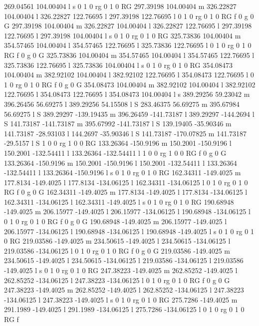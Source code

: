 269.04561 104.00404 l 
s 
0 1 0 rg 0 1 0 RG 
297.39198 104.00404 m 
326.22827 104.00404 l 
326.22827 122.76695 l 
297.39198 122.76695 l 
0 1 0 rg 0 1 0 RG f 
0 g 0 G 
297.39198 104.00404 m 
326.22827 104.00404 l 
326.22827 122.76695 l 
297.39198 122.76695 l 
297.39198 104.00404 l 
s 
0 1 0 rg 0 1 0 RG 
325.73836 104.00404 m 
354.57465 104.00404 l 
354.57465 122.76695 l 
325.73836 122.76695 l 
0 1 0 rg 0 1 0 RG f 
0 g 0 G 
325.73836 104.00404 m 
354.57465 104.00404 l 
354.57465 122.76695 l 
325.73836 122.76695 l 
325.73836 104.00404 l 
s 
0 1 0 rg 0 1 0 RG 
354.08473 104.00404 m 
382.92102 104.00404 l 
382.92102 122.76695 l 
354.08473 122.76695 l 
0 1 0 rg 0 1 0 RG f 
0 g 0 G 
354.08473 104.00404 m 
382.92102 104.00404 l 
382.92102 122.76695 l 
354.08473 122.76695 l 
354.08473 104.00404 l 
s 
389.29256 59.23042 m 
396.26456 56.69275 l 
389.29256 54.15508 l 
S 
283.46375 56.69275 m 
395.67984 56.69275 l 
S 
389.29297 -139.19435 m 
396.26459 -141.73187 l 
389.29297 -144.2694 l 
S 
141.73187 -141.73187 m 
395.67992 -141.73187 l 
S 
139.19405 -35.90346 m 
141.73187 -28.93103 l 
144.2697 -35.90346 l 
S 
141.73187 -170.07825 m 
141.73187 -29.5157 l 
S 
1 0 0 rg 1 0 0 RG 
133.26364 -150.9196 m 
150.2001 -150.9196 l 
150.2001 -132.54411 l 
133.26364 -132.54411 l 
1 0 0 rg 1 0 0 RG f 
0 g 0 G 
133.26364 -150.9196 m 
150.2001 -150.9196 l 
150.2001 -132.54411 l 
133.26364 -132.54411 l 
133.26364 -150.9196 l 
s 
0 1 0 rg 0 1 0 RG 
162.34311 -149.4025 m 
177.8134 -149.4025 l 
177.8134 -134.06125 l 
162.34311 -134.06125 l 
0 1 0 rg 0 1 0 RG f 
0 g 0 G 
162.34311 -149.4025 m 
177.8134 -149.4025 l 
177.8134 -134.06125 l 
162.34311 -134.06125 l 
162.34311 -149.4025 l 
s 
0 1 0 rg 0 1 0 RG 
190.68948 -149.4025 m 
206.15977 -149.4025 l 
206.15977 -134.06125 l 
190.68948 -134.06125 l 
0 1 0 rg 0 1 0 RG f 
0 g 0 G 
190.68948 -149.4025 m 
206.15977 -149.4025 l 
206.15977 -134.06125 l 
190.68948 -134.06125 l 
190.68948 -149.4025 l 
s 
0 1 0 rg 0 1 0 RG 
219.03586 -149.4025 m 
234.50615 -149.4025 l 
234.50615 -134.06125 l 
219.03586 -134.06125 l 
0 1 0 rg 0 1 0 RG f 
0 g 0 G 
219.03586 -149.4025 m 
234.50615 -149.4025 l 
234.50615 -134.06125 l 
219.03586 -134.06125 l 
219.03586 -149.4025 l 
s 
0 1 0 rg 0 1 0 RG 
247.38223 -149.4025 m 
262.85252 -149.4025 l 
262.85252 -134.06125 l 
247.38223 -134.06125 l 
0 1 0 rg 0 1 0 RG f 
0 g 0 G 
247.38223 -149.4025 m 
262.85252 -149.4025 l 
262.85252 -134.06125 l 
247.38223 -134.06125 l 
247.38223 -149.4025 l 
s 
0 1 0 rg 0 1 0 RG 
275.7286 -149.4025 m 
291.1989 -149.4025 l 
291.1989 -134.06125 l 
275.7286 -134.06125 l 
0 1 0 rg 0 1 0 RG f 
